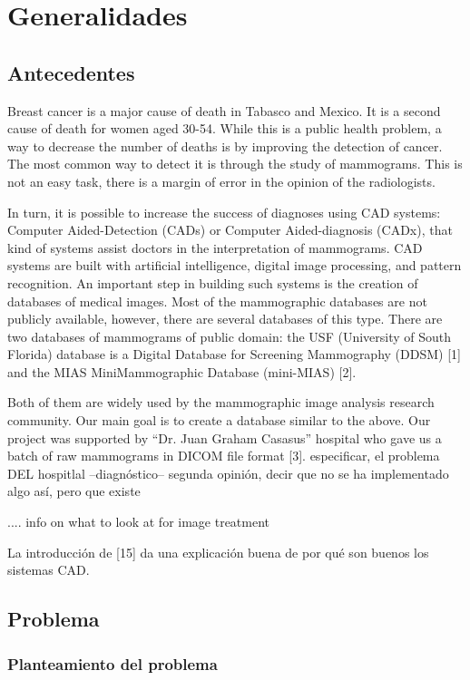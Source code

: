 \chapter{Generalidades}

\section{Antecedentes}

Breast cancer is a major cause of death in Tabasco and Mexico. It is a second
cause of death for women aged 30-54. While this is a public health problem, a
way to decrease the number of deaths is by improving the detection of cancer.
The most common way to detect it is through the study of mammograms. This is
not an easy task, there is a margin of error in the opinion of the
radiologists.

In turn, it is possible to increase the success of diagnoses
using CAD systems: Computer Aided-Detection (CADs) or Computer Aided-diagnosis
(CADx), that kind of systems assist doctors in the interpretation of
mammograms. CAD systems are built with artificial intelligence, digital image
processing, and pattern recognition.  An important step in building such
systems is the creation of databases of medical images. Most of the
mammographic databases are not publicly available, however, there are several
databases of this type. There are two databases of mammograms of public domain:
the USF (University of South Florida) database is a Digital Database for
Screening Mammography (DDSM) [1] and the MIAS MiniMammographic Database
(mini-MIAS) [2]. 

Both of them are widely used by the mammographic image analysis research
community.  Our main goal is to create a database similar to the above.  Our
project was supported by “Dr. Juan Graham Casasus” hospital who gave us a batch
of raw mammograms in DICOM file format [3].  especificar, el problema DEL
hospitlal --diagnóstico-- segunda opinión, decir que no se ha implementado algo
así, pero que existe
 
.... info on what to look at for image treatment 

La introducción de [15] da una explicación buena de por qué son buenos los
sistemas CAD.

\section{Problema}
\subsection{Planteamiento del problema}

